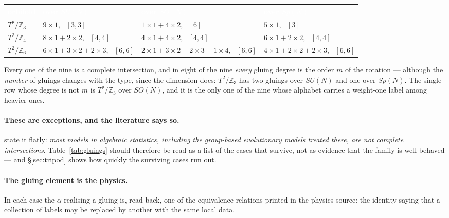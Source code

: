 \documentclass[11pt,a4paper]{article}
\theoremstyle{definition}
\newcommand{\ZZ}{\mathbb{Z}}
\newcommand{\su}[1]{SU(#1)}
\newcommand{\so}[1]{SO(#1)}
\newcommand{\sy}[1]{Sp(#1)}
\begin{document}
\begin{center}\small
\begin{tabular}{llll}
\toprule
\rowcolor{hdrblue}
\textcolor{white}{orbifold} & \textcolor{white}{over $\su N$} & \textcolor{white}{over $\so N$} &
\textcolor{white}{over $\sy N$}\\
\midrule
$T^2/\ZZ_3$ & $9{\times}1$, \ $[3,3]$ & $1{\times}1+4{\times}2$, \ $[6]$ &
$5{\times}1$, \ $[3]$\\
\rowcolor{softgrey}
$T^2/\ZZ_4$ & $8{\times}1+2{\times}2$, \ $[4,4]$ & $4{\times}1+4{\times}2$, \ $[4,4]$ &
$6{\times}1+2{\times}2$, \ $[4,4]$\\
$T^2/\ZZ_6$ & $6{\times}1+3{\times}2+2{\times}3$, \ $[6,6]$ &
$2{\times}1+3{\times}2+2{\times}3+1{\times}4$, \ $[6,6]$ &
$4{\times}1+2{\times}2+2{\times}3$, \ $[6,6]$\\
\bottomrule
\end{tabular}
\end{center}

\noindent
Every one of the nine is a complete intersection, and in eight of the nine \emph{every} gluing
degree is the order $m$ of the rotation --- although the \emph{number} of gluings changes with the
type, since the dimension does: $T^2/\ZZ_3$ has two gluings over $\su N$ and one over $\sy N$. The
single row whose degree is not $m$ is $T^2/\ZZ_3$ over $\so N$, and it is the only one of the nine
whose alphabet carries a weight-one label among heavier ones.

\paragraph{These are exceptions, and the literature says so.} \cite[\S7]{SSphylo} state it flatly:
\emph{most models in algebraic statistics, including the group-based evolutionary models treated
there, are not complete intersections}. Table~\ref{tab:gluings} should therefore be read as a list
of the cases that survive, not as evidence that the family is well behaved --- and
\S\ref{sec:tripod} shows how quickly the surviving cases run out.

\paragraph{The gluing element is the physics.} In each case the $\alpha$ realising a gluing is,
read back, one of the equivalence relations printed in the physics source: the identity saying that
a collection of labels may be replaced by another with the same local data.
\end{document}
